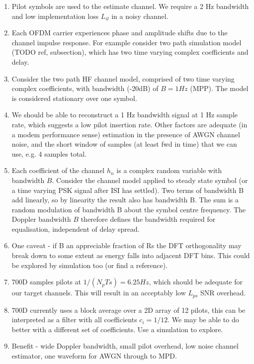 \documentclass{article}
\begin{document}
\begin{enumerate}
\item Pilot symbols are used to the estimate channel.  We require a 2 Hz bandwidth and low implementation loss $L_{il}$ in a noisy channel.
\item Each OFDM carrier experiences phase and amplitude shifts due to the channel impulse response.  For example consider two path simulation model (TODO ref, subsection), which has two time varying complex coefficients and delay.
\item Consider the two path HF channel model, comprised of two time varying complex coefficients, with bandwidth (-20dB) of $B=1 \si{Hz}$ (MPP).  The model is considered stationary over one symbol.
\item We should be able to reconstruct a 1 Hz bandwidth signal at 1 Hz sample rate, which suggests a low pilot insertion rate.  Other factors are adequate (in a modem performance sense) estimation in the presence of AWGN channel noise, and the short window of samples (at least fwd in time) that we can use, e.g. 4 samples total.
\item Each coefficient of the channel $h_n$ is a complex random variable with bandwidth $B$. Consider the channel model applied to steady state symbol (or a time varying PSK signal after ISI has settled). Two terms of bandwidth B add linearly, so by linearity the result also has bandwidth B.  The sum is a random modulation of bandwidth B about the symbol centre frequency.  The Doppler bandwidth $B$ therefore defines the bandwidth required for equalisation, independent of delay spread.
\item One caveat - if B an appreciable fraction of Rs the DFT orthogonality may break down to some extent as energy falls into adjacent DFT bins.  This could be explored by simulation too (or find a reference).
\item 700D samples pilots at $1/(N_pTs)=6.25 \si{Hz}$, which should be adequate for our target channels.  This will result in an acceptably low $L_{ps}$ SNR overhead.
\item 700D currently uses a block average over a 2D array of 12 pilots, this can be interpreted as a filter with all coefficients $c_i=1/12$. We may be able to do better with a different set of coefficients.  Use a simulation to explore.
\item Benefit - wide Doppler bandwidth, small pilot overhead, low noise channel estimator, one waveform for AWGN through to MPD.
\end{enumerate}
\end{document}
